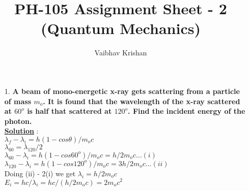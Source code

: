 \documentclass[10pt, a4paper]{article}
\begin{document}
	\title{PH-105 Assignment Sheet - 2 (Quantum Mechanics)}
	\date{}
	\author{Vaibhav Krishan}
	\maketitle
	\newcommand{\angstrom}{\mbox{\normalfont\AA}}
	\begin{enumerate}
		\item[1.] {\bf A beam of mono-energetic x-ray gets scattering from a particle of mass \begin{math}m_o\end{math}. It is
found that the wavelength of the x-ray scattered at \begin{math}60^o\end{math} is half that scattered at
\begin{math}120^o\end{math}. Find the incident energy of the photon.}\\
		{\underline {\bf Solution}} :\\
		\begin{math} \lambda_f - \lambda_i = h(1 - cos\theta)/m_oc\end{math}\\
		\begin{math} \lambda_{60} = \lambda_{120} / 2\end{math}\\
		\begin{math} \lambda_{60} - \lambda_i = h(1 - cos60^o)/m_oc = h/2m_oc ... (i)\end{math}\\
		\begin{math} \lambda_{120} - \lambda_i = h(1 - cos120^o) / m_oc = 3h/2m_oc ...(ii)\end{math}\\
		Doing (ii) - 2(i) we get
		\begin{math} \lambda_i = h/2m_oc\end{math}\\
		\begin{math} E_i = hc/\lambda_i = hc/(h/2m_oc) = 2m_oc^2\end{math}\\
	\end{enumerate}
\end{document}
